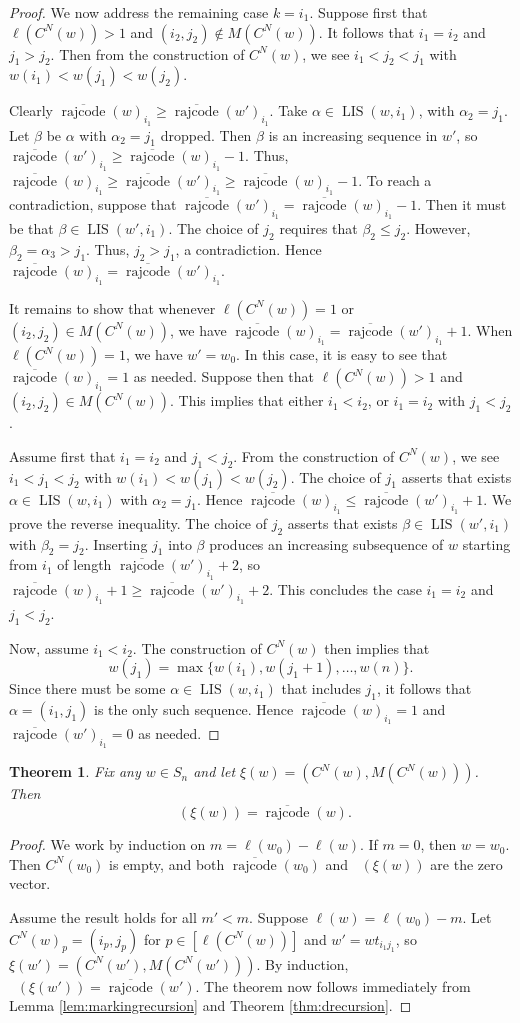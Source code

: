 \documentclass[11pt]{amsart}
\newtheorem{theorem}{Theorem}[section]
\theoremstyle{definition}
\theoremstyle{named}
\newcommand{\CN}{C^N}
\DeclareMathOperator{\rr}{\mathrm{rajcode}} %
\newcommand{\orr}{\overline{\rr}} %
\DeclareMathOperator{\LIS}{\mathrm{LIS}}
\DeclareMathOperator{\dwt}{\overline{\mathrm{wt}}}
\begin{document}
\begin{proof}
		We now address the remaining case $k=i_1$. Suppose first that $\ell(\CN(w))>1$ and $(i_2,j_2)\notin M(\CN(w))$. It follows that $i_1=i_2$ and $j_1>j_2$. Then from the construction of $\CN(w)$, we see $i_1<j_2<j_1$ with $w(i_1)<w(j_1)<w(j_2)$. 
		
		Clearly $\orr(w)_{i_1}\geq \orr(w')_{i_1}$. Take $\alpha \in \LIS(w,i_1)$, with $\alpha_2=j_1$. Let $\beta$ be $\alpha$ with $\alpha_2=j_1$ dropped. Then $\beta$ is an increasing sequence in $w'$, so $\orr(w')_{i_1}\geq \orr(w)_{i_1}-1$. Thus, $\orr(w)_{i_1}\geq \orr(w')_{i_1}\geq \orr(w)_{i_1}-1$. To reach a contradiction, suppose that $\orr(w')_{i_1}= \orr(w)_{i_1}-1$. Then it must be that $\beta\in \LIS(w',i_1)$. The choice of $j_2$ requires that $\beta_2\leq j_2$. However, $\beta_2=\alpha_3>j_1$. Thus, $j_2>j_1$, a contradiction. Hence $\orr(w)_{i_1} = \orr(w')_{i_1}$.
		
		It remains to show that whenever $\ell(\CN(w))=1$ or $(i_2,j_2)\in M(\CN(w))$, we have $\orr(w)_{i_1} = \orr(w')_{i_1}+1$. When $\ell(\CN(w))=1$, we have $w'=w_0$. In this case, it is easy to see that $\orr(w)_{i_1}=1$ as needed. Suppose then that $\ell(\CN(w))>1$ and $(i_2,j_2)\in M(\CN(w))$. This implies that either $i_1<i_2$, or $i_1=i_2$ with $j_1<j_2$.
		
		Assume first that $i_1=i_2$ and $j_1<j_2$. From the construction of $\CN(w)$, we see $i_1<j_1<j_2$ with $w(i_1)<w(j_1)<w(j_2)$. 
		The choice of $j_1$ asserts that exists $\alpha\in \LIS(w,i_1)$ with $\alpha_2=j_1$. Hence $\orr(w)_{i_1}\leq \orr(w')_{i_1}+1$. We prove the reverse inequality. The choice of $j_2$ asserts that exists $\beta\in \LIS(w',i_1)$ with $\beta_2=j_2$. Inserting $j_1$ into $\beta$ produces an increasing subsequence of $w$ starting from $i_1$ of length $\orr(w')_{i_1}+2$, so $\orr(w)_{i_1}+1\geq \orr(w')_{i_1}+2$. This concludes the case $i_1=i_2$ and $j_1<j_2$.
		
		Now, assume $i_1<i_2$. The construction of $\CN(w)$ then implies that 
		\[w(j_1) = \max\{w(i_1),w(j_1+1),\ldots, w(n) \}.\] 
		Since there must be some $\alpha\in \LIS(w,i_1)$ that includes $j_1$, it follows that $\alpha = (i_1,j_1)$ is the only such sequence. Hence $\orr(w)_{i_1} = 1$ and $\orr(w')_{i_1} =0$ as needed.
	\end{proof}
	
	\begin{theorem}
		\label{thm:strongequality}
		Fix any $w\in S_n$ and let $\xi(w)=(\CN(w),M(\CN(w)))$. Then \[\dwt(\xi(w)) = \orr(w).\]
	\end{theorem}
	\begin{proof}
		We work by induction on $m=\ell(w_0)-\ell(w)$. If $m=0$, then $w=w_0$. Then $\CN(w_0)$ is empty, and both $\orr(w_0)$ and $\dwt(\xi(w))$ are the zero vector.
		
		Assume the result holds for all $m'<m$. Suppose $\ell(w)=\ell(w_0)-m$. Let $\CN(w)_p=(i_p,j_p)$ for $p\in [\ell(\CN(w))]$ and $w'=wt_{i_1j_1}$, so $\xi(w')=(\CN(w'),M(\CN(w')))$. By induction, $\dwt(\xi(w')) = \orr(w')$. The theorem now follows immediately from Lemma \ref{lem:markingrecursion} and Theorem \ref{thm:drecursion}.
	\end{proof}
	
\end{document}
